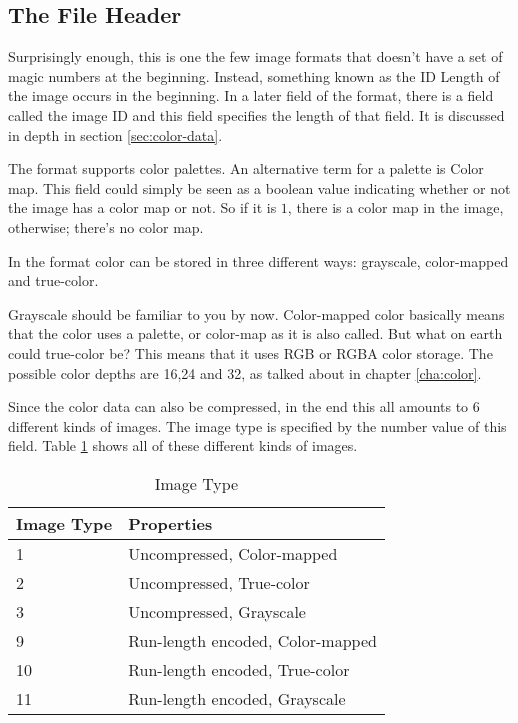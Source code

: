 \begin{refsection}
  \section{The File Header}


  Surprisingly enough, this is one the few image formats that doesn't
  have a set of magic numbers at the beginning. Instead, something
  known as the ID Length of the image occurs in the beginning. In a
  later field of the format, there is a field called the image
  ID and this field specifies the length of that field. It is discussed
  in depth in section \ref{sec:color-data}.


  The \tga format supports color palettes. An alternative term for a
  palette is Color map. This field could simply be
  seen as a boolean value indicating whether or not the image has a color
  map or not. So if it is $1$, there is a color map in the
  image, otherwise; there's no color map.


  In the \tga format color can be stored in three different ways:
  grayscale, color-mapped and
  true-color.

  Grayscale should be familiar to you by now. Color-mapped color
  basically means that the color uses a palette, or color-map as it is
  also called. But what on earth could true-color be? This means that
  it uses RGB or RGBA color storage. The possible color depths are
  16,24 and 32, as talked about in chapter \ref{cha:color}.

  Since the color data can also be compressed, in the end this all
  amounts to $6$ different kinds of images. The image type is
  specified by the number value of this field. Table \ref{tab:imgtype}
  shows all of these different kinds of images.

  \begin{table}
    \centering
    \begin{tabular}{ll}
      \toprule
      Image Type & Properties \\
      \midrule
      1 & Uncompressed, Color-mapped \\
      2 & Uncompressed, True-color \\
      3 & Uncompressed, Grayscale\\
      9 & Run-length encoded, Color-mapped \\
      10 & Run-length encoded, True-color \\
      11 & Run-length encoded, Grayscale\\
      \bottomrule
    \end{tabular}
    \caption{Image Type}
    \label{tab:imgtype}
  \end{table}


\end{refsection}
